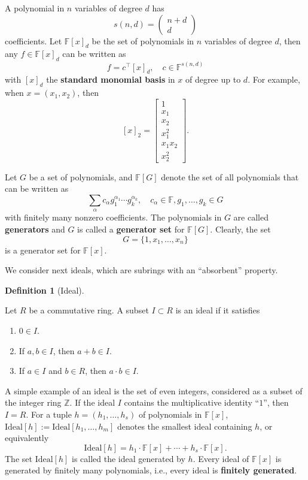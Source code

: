 \documentclass[
]{book}
\theoremstyle{definition}
\newtheorem{definition}{Definition}[chapter]
\theoremstyle{definition}
\theoremstyle{definition}
\theoremstyle{definition}
\theoremstyle{remark}
\begin{document}
A polynomial in \(n\) variables of degree \(d\) has
\[
s(n,d) = \begin{pmatrix} n + d \\ d \end{pmatrix}
\]
coefficients. Let \(\mathbb{F}[x]_{d}\) be the set of polynomials in \(n\) variables of degree \(d\), then any \(f \in \mathbb{F}[x]_d\) can be written as
\[
f = c^\top[x]_d, \quad c \in \mathbb{F}^{s(n,d)}
\]
with \([x]_d\) the \textbf{standard monomial basis} in \(x\) of degree up to \(d\). For example, when \(x = (x_1,x_2)\), then
\[
[x]_2 = \begin{bmatrix} 1 \\ x_1 \\ x_2 \\ x_1^2 \\ x_1 x_2 \\ x_2^2 \end{bmatrix}.
\]

Let \(G\) be a set of polynomials, and \(\mathbb{F}[G]\) denote the set of all polynomials that can be written as
\[
\sum_{\alpha} c_\alpha g_1^{\alpha_1} \cdots g_k^{\alpha_k}, \quad c_\alpha \in \mathbb{F}, g_1,\dots,g_k \in G
\]
with finitely many nonzero coefficients. The polynomials in \(G\) are called \textbf{generators} and \(G\) is called a \textbf{generator set} for \(\mathbb{F}[G]\). Clearly, the set
\[
G = \{1, x_1, \dots, x_n\}
\]
is a generator set for \(\mathbb{F}[x]\).

We consider next ideals, which are subrings with an ``absorbent'' property.

\begin{definition}[Ideal]
\protect\hypertarget{def:Ideal}{}\label{def:Ideal}

Let \(R\) be a commutative ring. A subset \(I \subset R\) is an ideal if it satisfies

\begin{enumerate}
\def\labelenumi{\arabic{enumi}.}
\item
  \(0 \in I\).
\item
  If \(a, b \in I\), then \(a + b \in I\).
\item
  If \(a \in I\) and \(b \in R\), then \(a \cdot b \in I\).
\end{enumerate}

\end{definition}

A simple example of an ideal is the set of even integers, considered as a subset of the integer ring \(\mathbb{Z}\). If the ideal \(I\) contains the multiplicative identity ``\(1\)'', then \(I = R\). For a tuple \(h = (h_1,\dots,h_s)\) of polynomials in \(\mathbb{F}[x]\), \(\mathrm{Ideal}[h]:= \mathrm{Ideal}[h_1,\dots,h_m]\) denotes the smallest ideal containing \(h\), or equivalently
\[
\mathrm{Ideal}[h] = h_1 \cdot \mathbb{F}[x] + \cdots + h_s \cdot \mathbb{F}[x].
\]
The set \(\mathrm{Ideal}[h]\) is called the ideal generated by \(h\). Every ideal of \(\mathbb{F}[x]\) is generated by finitely many polynomials, i.e., every ideal is \textbf{finitely generated}.
\end{document}
